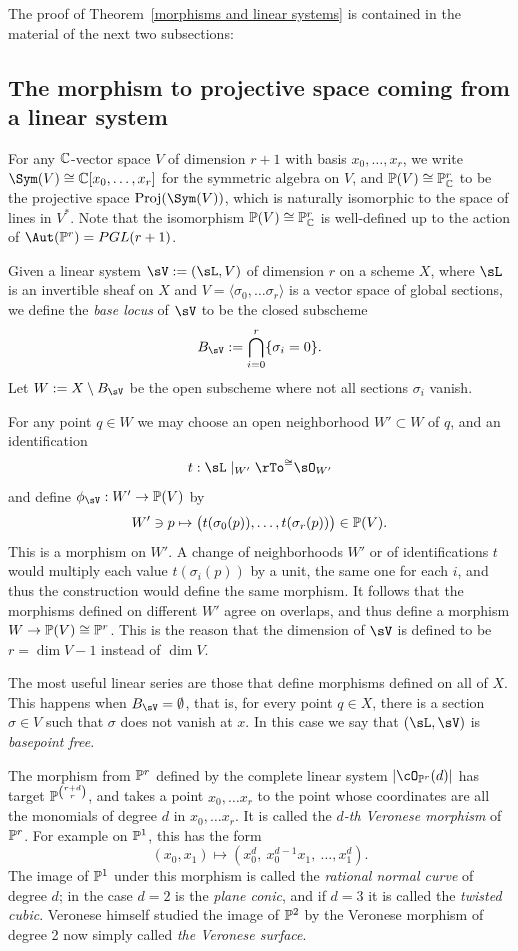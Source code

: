 The proof of Theorem~\ref{morphisms and linear systems} is contained in the material of the next two subsections:

\subsection{The morphism to projective space coming from a linear system} 
For any $\CC$-vector space $V$ of dimension $r+1$ with basis $x_{0}, \dots, x_{r}$, we write $\Sym(V) \cong \CC[x_{0},\dots, x_{r}]$ for the symmetric algebra on $V$, and
$\PP(V)\cong \PP^{r}_{\CC}$ to be the projective space ${\rm Proj}(\Sym(V))$, which is naturally isomorphic to the
space of lines in $V^{*}$. Note that the isomorphism $\PP(V)\cong \PP^{r}_{\CC}$ is well-defined up to the action
of $\Aut(\PP^r) = PGL(r+1)$.


Given a linear system $\sV:=(\sL, V)$  of dimension $r$ on a scheme $X$, where
$\sL$ is an invertible sheaf on $X$ and $V = \langle\sigma_{0}, \dots \sigma_{r}\rangle$ is a vector space of global sections, we define the \emph{base locus} of $\sV$ to be the closed subscheme 
$$
B_\sV := \bigcap_{i= 0}^{r}\{\sigma_{i} = 0\}.
$$
Let $W:=X\setminus B_\sV$ be the open subscheme where not all sections $\sigma_{i}$ vanish.

For any point $q\in W$ we  may choose an open neighborhood $W'\subset W$ of $q$, and an identification 
$$
t: \sL\mid_{W'} \rTo^{\cong} \sO_{W'}
$$
and define $\phi_{\sV}: W' \to \PP(V)$ by 
$$
W'\ni p \mapsto \bigl(t(\sigma_{0}(p)),\dots, t(\sigma_{r}(p))\bigr) \in \PP(V).
$$
This  is a morphism on $W'$. A change of neighborhoods $W'$ or of identifications $t$ would multiply
each value $t(\sigma_{i}(p))$ by a unit, the same one for each $i$, and thus the construction would define the same morphism. It follows that the morphisms
defined on different $W'$ agree on overlaps, and thus define a morphism $W \to \PP(V) \cong \PP^r$. This is the reason
that the dimension of $\sV$ is defined to be $r=\dim V -1$ instead of $\dim V$.

The most useful linear series are those that define morphisms defined on all of $X$. This happens when $B_\sV = \emptyset$,
that is, for every point $q\in X$, there is a section $\sigma \in V$ such that $\sigma$ does not vanish at $x$. In this case we say that $(\sL, \sV)$ is \emph{basepoint free}.

\begin{example}\label{Veronese definition}
The morphism from $\PP^r$ defined by the complete linear system $|\cO_{\PP^r}(d)|$ has target
$\PP^{r+d\choose r}$, and takes a point $x_0,\dots x_r$ to the point whose coordinates are all the monomials of
degree $d$ in $x_0,\dots x_r$. It is called the \emph{$d$-th Veronese morphism} of $\PP^r$. For example on $\PP^1$, this has the form
$$
(x_0,x_1) \mapsto (x_0^d,\ x_0^{d-1}x_1,\ \dots,x_1^d).
$$
The image of $\PP^1$ under this morphism is called the \emph{rational normal curve} of degree $d$; in the case $d=2$ is the
\emph{plane conic}, and if $d=3$ it is called the \emph{twisted cubic}. Veronese himself studied the image of $\PP^2$
by the Veronese morphism of degree 2 now simply called \emph{the Veronese surface}.
\end{example}

